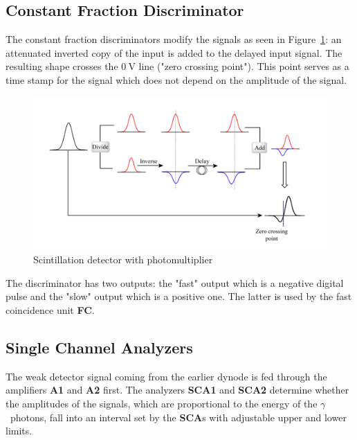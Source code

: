\documentclass[twocolumn]{article}
\begin{document}
\subsection{Constant Fraction Discriminator}
The constant fraction discriminators modify the signals as seen in Figure~\ref{fig:cfd}: an attenuated inverted copy of the input is added to the delayed input signal. The resulting shape crosses the $\SI{0}{\volt}$ line ("zero crossing point"). This point serves as a time stamp for the signal which does not depend on the amplitude of the signal.
\begin{figure}[!h]
	\centering
	\includegraphics[width=1.02\linewidth]{cfd.png}
	\caption{Scintillation detector with photomultiplier \cite{cfd}} 
	\label{fig:cfd}
\end{figure}
The discriminator has two outputs: the "fast" output which is a negative digital pulse and the "slow" output which is a positive one. The latter is used by the fast coincidence unit \textbf{FC}.


\subsection{Single Channel Analyzers}
The weak detector signal coming from the earlier dynode is fed through the amplifiers \textbf{A1} and \textbf{A2} first. The analyzers \textbf{SCA1} and \textbf{SCA2} determine whether the amplitudes of the signals, which are proportional to the energy of the $\gamma$~photons, fall into an interval set by the \textbf{SCA}s with adjustable upper and lower limits.
\end{document}
